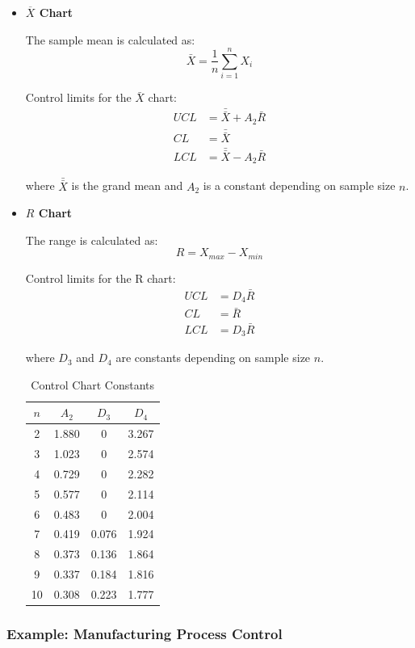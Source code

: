 \documentclass[twoside]{book}
\begin{document}
\begin{itemize}
\item \textbf{$\overline{X}$ Chart}

The sample mean is calculated as:
$$\bar{X} = \frac{1}{n}\sum_{i=1}^{n} X_i$$

Control limits for the $\bar{X}$ chart:
\begin{align}
UCL &= \bar{\bar{X}} + A_2 \bar{R}\\
CL &= \bar{\bar{X}}\\
LCL &= \bar{\bar{X}} - A_2 \bar{R}
\end{align}

where $\bar{\bar{X}}$ is the grand mean and $A_2$ is a constant depending on sample size $n$.

\item \textbf{$ R $ Chart}

The range is calculated as:
$$R = X_{max} - X_{min}$$

Control limits for the R chart:
\begin{align}
UCL &= D_4 \bar{R}\\
CL &= \bar{R}\\
LCL &= D_3 \bar{R}
\end{align}

where $D_3$ and $D_4$ are constants depending on sample size $n$.


\begin{table}[H]
\centering
\caption{Control Chart Constants}
\begin{tabular}{cccc}
\toprule
$n$ & $A_2$ & $D_3$ & $D_4$ \\
\midrule
2 & 1.880 & 0 & 3.267 \\
3 & 1.023 & 0 & 2.574 \\
4 & 0.729 & 0 & 2.282 \\
5 & 0.577 & 0 & 2.114 \\
6 & 0.483 & 0 & 2.004 \\
7 & 0.419 & 0.076 & 1.924 \\
8 & 0.373 & 0.136 & 1.864 \\
9 & 0.337 & 0.184 & 1.816 \\
10 & 0.308 & 0.223 & 1.777 \\
\bottomrule
\end{tabular}
\end{table}
\end{itemize}


\subsubsection{Example: Manufacturing Process Control}
\end{document}
